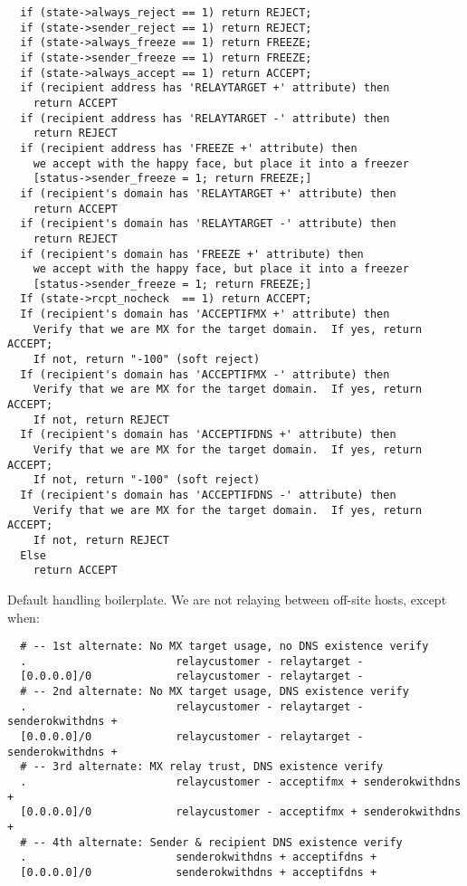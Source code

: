 \begin{verbatim}
  if (state->always_reject == 1) return REJECT;
  if (state->sender_reject == 1) return REJECT;
  if (state->always_freeze == 1) return FREEZE;
  if (state->sender_freeze == 1) return FREEZE;
  if (state->always_accept == 1) return ACCEPT;
  if (recipient address has 'RELAYTARGET +' attribute) then
    return ACCEPT
  if (recipient address has 'RELAYTARGET -' attribute) then
    return REJECT
  if (recipient address has 'FREEZE +' attribute) then
    we accept with the happy face, but place it into a freezer
    [status->sender_freeze = 1; return FREEZE;]
  if (recipient's domain has 'RELAYTARGET +' attribute) then
    return ACCEPT
  if (recipient's domain has 'RELAYTARGET -' attribute) then
    return REJECT
  if (recipient's domain has 'FREEZE +' attribute) then
    we accept with the happy face, but place it into a freezer
    [status->sender_freeze = 1; return FREEZE;]
  If (state->rcpt_nocheck  == 1) return ACCEPT;
  If (recipient's domain has 'ACCEPTIFMX +' attribute) then
    Verify that we are MX for the target domain.  If yes, return ACCEPT;
    If not, return "-100" (soft reject)
  If (recipient's domain has 'ACCEPTIFMX -' attribute) then
    Verify that we are MX for the target domain.  If yes, return ACCEPT;
    If not, return REJECT
  If (recipient's domain has 'ACCEPTIFDNS +' attribute) then
    Verify that we are MX for the target domain.  If yes, return ACCEPT;
    If not, return "-100" (soft reject)
  If (recipient's domain has 'ACCEPTIFDNS -' attribute) then
    Verify that we are MX for the target domain.  If yes, return ACCEPT;
    If not, return REJECT
  Else
    return ACCEPT
\end{verbatim}


Default handling boilerplate. We are not relaying between off-site hosts, 
except when:

\begin{verbatim}
  # -- 1st alternate: No MX target usage, no DNS existence verify
  .                       relaycustomer - relaytarget -
  [0.0.0.0]/0             relaycustomer - relaytarget -
  # -- 2nd alternate: No MX target usage, DNS existence verify
  .                       relaycustomer - relaytarget - senderokwithdns +
  [0.0.0.0]/0             relaycustomer - relaytarget - senderokwithdns +
  # -- 3rd alternate: MX relay trust, DNS existence verify
  .                       relaycustomer - acceptifmx + senderokwithdns +
  [0.0.0.0]/0             relaycustomer - acceptifmx + senderokwithdns +
  # -- 4th alternate: Sender & recipient DNS existence verify
  .                       senderokwithdns + acceptifdns +
  [0.0.0.0]/0             senderokwithdns + acceptifdns +
\end{verbatim}


